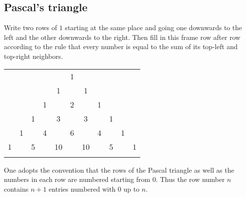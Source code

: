 \subsection{Pascal's triangle}
Write two rows of $1$ starting at the same place and going one downwards to the left and the other downwards to the right.
Then fill in this frame row after row according to the rule that every number is equal to the sum
of its top-left and top-right neighbors.

\begin{center}
\begin{tabular}{ccccccccccc}
&    &    &    &    &  1\\\noalign{\smallskip\smallskip}
&    &    &    &  1 &    &  1\\\noalign{\smallskip\smallskip}
&    &    &  1 &    &  2 &    &  1\\\noalign{\smallskip\smallskip}
&    &  1 &    &  3 &    &  3 &    &  1\\\noalign{\smallskip\smallskip}
&  1 &    &  4 &    &  6 &    &  4 &    & 1\\\noalign{\smallskip\smallskip}
1&   &  5 &    & 10 &    & 10 &    &  5 &   & 1\\\noalign{\smallskip\smallskip}
\end{tabular}
\end{center}

One adopts the convention that the rows of the Pascal triangle as well as the numbers in each row are numbered starting from $0$.
Thus the row number $n$ contains $n+1$ entries numbered with $0$ up to $n$.
